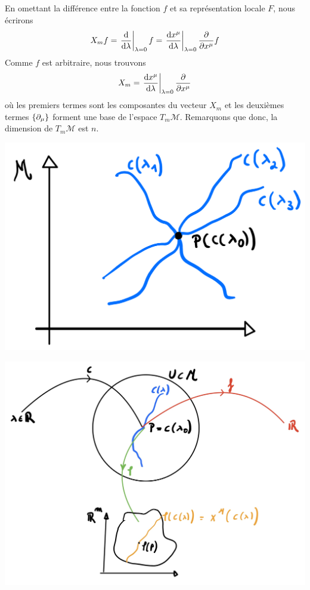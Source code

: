 En omettant la différence entre la fonction $f$ et sa représentation locale $F$, nous écrirons
\begin{align}
    X_m f = \left. \frac{\mathrm{d}}{\mathrm{d} \lambda} \right|_{\lambda=0} f = \left. \frac{\mathrm{d} x^\mu}{\mathrm{d} \lambda} \right|_{\lambda = 0} \frac{\partial}{\partial x^\mu}f
\end{align}
Comme $f$ est arbitraire, nous trouvons
\begin{equation}
    X_m = \left. \frac{\mathrm{d} x^\mu}{\mathrm{d} \lambda} \right|_{\lambda = 0} \frac{\partial}{\partial x^\mu}
\end{equation}
où les premiers termes sont les composantes du vecteur $X_m$ et les deuxièmes termes $\{\partial_\mu \}$ forment une base de l'espace $T_m\mathcal{M}$. Remarquons que donc, la dimension de $T_m\mathcal{M}$ est $n$.
\begin{center}
\includegraphics[scale=0.1]{Chapitres/3.Element de géométrie différentielle/Images/vecteurs2.0.jpg}
\end{center}


\begin{center}
\includegraphics[scale=0.1]{Chapitres/3.Element de géométrie différentielle/Images/dimenson.jpg}
\end{center}



